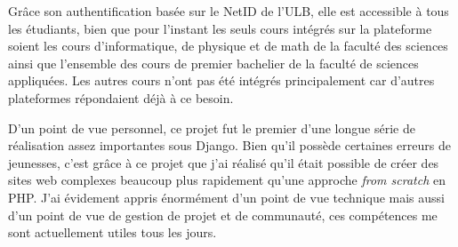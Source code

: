 \documentclass[a4paper,12pt]{article}
\begin{document}
Grâce son authentification basée sur le NetID de l'ULB, elle est accessible à tous les étudiants,
bien que pour l'instant les seuls cours intégrés sur la plateforme soient
les cours d'informatique, de physique et de math de la faculté des sciences ainsi
que l'ensemble des cours de premier bachelier de la faculté de sciences appliquées.
Les autres cours n'ont pas été intégrés principalement car d'autres plateformes
répondaient déjà à ce besoin.

D'un point de vue personnel, ce projet fut le premier d'une longue série de réalisation
assez importantes sous Django. Bien qu'il possède certaines erreurs de jeunesses, c'est grâce
à ce projet que j'ai réalisé qu'il était possible de créer des sites
web complexes beaucoup plus rapidement qu'une approche \textit{from scratch} en PHP.
J'ai évidement appris énormément d'un point de vue technique mais aussi d'un
point de vue de gestion de projet et de communauté, ces compétences me sont actuellement utiles tous les jours.
\end{document}

